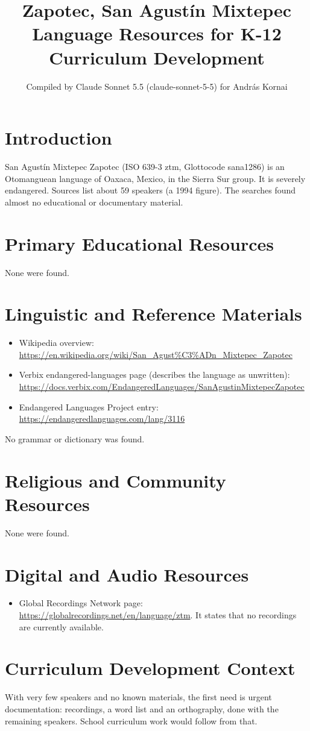 \documentclass[12pt]{article}
\title{Zapotec, San Agust\'in Mixtepec Language Resources for K-12 Curriculum Development}
\author{Compiled by Claude Sonnet 5.5 (claude-sonnet-5-5) for Andr\'as Kornai}
\date{}
\begin{document}
\maketitle

\section{Introduction}
San Agust\'in Mixtepec Zapotec (ISO 639-3 ztm, Glottocode sana1286) is an Otomanguean language of Oaxaca, Mexico, in the Sierra Sur group. It is severely endangered. Sources list about 59 speakers (a 1994 figure). The searches found almost no educational or documentary material.

\section{Primary Educational Resources}
None were found.

\section{Linguistic and Reference Materials}
\begin{itemize}
\item Wikipedia overview: \url{https://en.wikipedia.org/wiki/San_Agust%C3%ADn_Mixtepec_Zapotec}
\item Verbix endangered-languages page (describes the language as unwritten): \url{https://docs.verbix.com/EndangeredLanguages/SanAgustinMixtepecZapotec}
\item Endangered Languages Project entry: \url{https://endangeredlanguages.com/lang/3116}
\end{itemize}
No grammar or dictionary was found.

\section{Religious and Community Resources}
None were found.

\section{Digital and Audio Resources}
\begin{itemize}
\item Global Recordings Network page: \url{https://globalrecordings.net/en/language/ztm}. It states that no recordings are currently available.
\end{itemize}

\section{Curriculum Development Context}
With very few speakers and no known materials, the first need is urgent documentation: recordings, a word list and an orthography, done with the remaining speakers. School curriculum work would follow from that.
\end{document}

